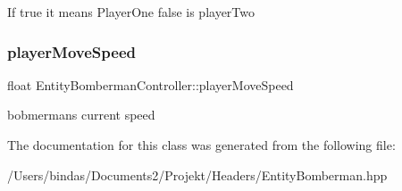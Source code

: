 If true it means Player\+One false is player\+Two \mbox{\label{class_entity_bomberman_controller_aa547862699a79584468698a827a58736}} 
\subsubsection{\texorpdfstring{playerMoveSpeed}{playerMoveSpeed}}
{\footnotesize\ttfamily float Entity\+Bomberman\+Controller\+::player\+Move\+Speed\hspace{0.3cm}{\ttfamily [private]}}

bobmerman\textquotesingle{}s current speed 

The documentation for this class was generated from the following file\+:\begin{DoxyCompactItemize}
\item 
/\+Users/bindas/\+Documents2/\+Projekt/\+Headers/Entity\+Bomberman.\+hpp\end{DoxyCompactItemize}

